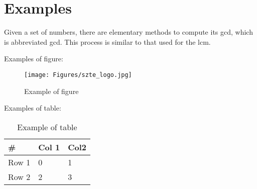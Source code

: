 \documentclass[12pt,a4paper,twoside]{book}
\begin{document}



\frontmatter
\renewcommand{\chaptermark}[1]{\markboth{#1}{}}
\renewcommand{\sectionmark}[1]{\markright{\thesection\ #1}}
\pagestyle{frontmatter}











\begingroup
\let\cleardoublepage\clearpage
\tableofcontents
\listoffigures
\listoftables
\endgroup












\renewcommand{\chaptermark}[1]{\markboth{#1}{}}
\renewcommand{\sectionmark}[1]{\markright{\thesection\ #1}}
\mainmatter
\pagestyle{mainmatter}




\printglossary[type=\acronymtype, title=Abbreviations]



\section{Examples}

Given a set of numbers, there are elementary methods to compute 
its \acrlong{gcd}, which is abbreviated \acrshort{gcd}. This process 
is similar to that used for the \acrfull{lcm}.

Examples of figure:
\begin{figure}[h]
\caption{Example of figure}
\centering
\texttt{[image: Figures/szte\_logo.jpg]}
\end{figure}

Examples of table:
\begin{table}[h]
\centering
\begin{tabular}{|l|l|l|}
\hline
\#    & Col 1 & Col2 \\ \hline
Row 1 & 0     & 1    \\ \hline
Row 2 & 2     & 3    \\ \hline
\end{tabular}
\caption{Example of table}
\label{main:table_1}
\end{table}
\end{document}
